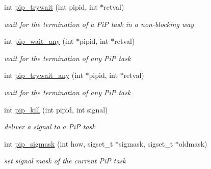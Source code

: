 \begin{DoxyCompactItemize}
\item 
int \hyperlink{group__libpip_ga02cab8b77b62ffcd98bd1bbb1e32b7e7}{pip\-\_\-trywait} (int pipid, int $\ast$retval)
\begin{DoxyCompactList}\small\item\em wait for the termination of a Pi\-P task in a non-\/blocking way \end{DoxyCompactList}\end{DoxyCompactItemize}
\begin{DoxyCompactItemize}
\item 
int \hyperlink{group__libpip_gade2b18ac0e11ec827ad68656591c7518}{pip\-\_\-wait\-\_\-any} (int $\ast$pipid, int $\ast$retval)
\begin{DoxyCompactList}\small\item\em wait for the termination of any Pi\-P task \end{DoxyCompactList}\end{DoxyCompactItemize}
\begin{DoxyCompactItemize}
\item 
int \hyperlink{group__libpip_ga65731447fedb85cbe4d5c38093383a20}{pip\-\_\-trywait\-\_\-any} (int $\ast$pipid, int $\ast$retval)
\begin{DoxyCompactList}\small\item\em wait for the termination of any Pi\-P task \end{DoxyCompactList}\end{DoxyCompactItemize}
\begin{DoxyCompactItemize}
\item 
int \hyperlink{group__libpip_ga4a396f38920d94b71dcfd3c898fbb82b}{pip\-\_\-kill} (int pipid, int signal)
\begin{DoxyCompactList}\small\item\em deliver a signal to a Pi\-P task \end{DoxyCompactList}\end{DoxyCompactItemize}
\begin{DoxyCompactItemize}
\item 
int \hyperlink{group__libpip_ga3dc0c780c6bc085a6ea194d9485d75b2}{pip\-\_\-sigmask} (int how, sigset\-\_\-t $\ast$sigmask, sigset\-\_\-t $\ast$oldmask)
\begin{DoxyCompactList}\small\item\em set signal mask of the current Pi\-P task \end{DoxyCompactList}\end{DoxyCompactItemize}
